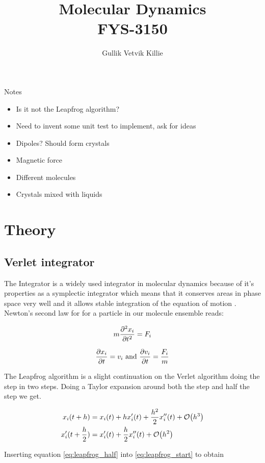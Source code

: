 \documentclass[11pt]{article}
\title{ Molecular Dynamics \\ FYS-3150 }
\author{Gullik Vetvik Killie }
\begin{document}
\maketitle

\tableofcontents

\newpage
Notes
\begin{itemize}
\item Is it not the Leapfrog algorithm?
\item Need to invent some unit test to implement, ask for ideas
\item Dipoles? Should form crystals
\item Magnetic force
\item Different molecules
\item Crystals mixed with liquids
\end{itemize}

\section{Theory}
	\subsection{Verlet integrator}
		The Integrator is a widely used integrator in  molecular dynamics \cite{compPhys} because of it's properties as a symplectic integrator which means that it conserves areas in phase space very well and it allows stable integration of the equation of motion \cite{aBInitio}. Newton's second law for for a particle in our molecule ensemble reads:

		\[m\pdv[2]{x_{i}}{t} = F_{i}\]

		\[\pdv{x_{i}}{t} = v_{i} \text{     and     } \pdv{v_{i}}{t} = \frac{F_{i}}{m} \]

		The Leapfrog algorithm is a slight continuation on the Verlet algorithm doing the step in two steps. Doing a Taylor expansion around both the step and half the step we get.
	

		\begin{align}
			x_{i}(t+h) &= x_i(t) + hx_i'(t) + \frac{h^2}{2}x_i''(t) + \order{h^3} \label{eq:leapfrog_start}
			\\
			x_i'(t+ \frac{h}{2} ) &= x_i'(t) + \frac{h}{2} x_i''(t) + \order{h^2} \label{eq:leapfrog_half}
		\end{align}	

		\noindent Inserting equation \eqref{eq:leapfrog_half} into \eqref{eq:leapfrog_start} to obtain
\end{document}
